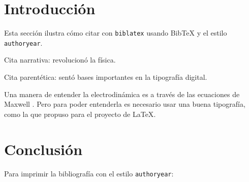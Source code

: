 \documentclass{article}
\begin{document}
\section{Introducción}

Esta sección ilustra cómo citar con \texttt{biblatex} usando BibTeX 
y el estilo \texttt{authoryear}.

Cita narrativa: \textcite{einstein1905} revolucionó la física.

Cita parentética: \parencite{knuth1984} sentó bases importantes 
en la tipografía digital.

Una manera de entender la electrodinámica es a través de las ecuaciones de Maxwell \parencite{einstein1905}. Pero para poder entenderla es necesario usar una buena tipografía, como la que propuso \cite{knuth1984} para el proyecto de \LaTeX \parencite{latexproject}.

\section{Conclusión}

Para imprimir la bibliografía con el estilo \texttt{authoryear}:
\printbibliography
\end{document}
